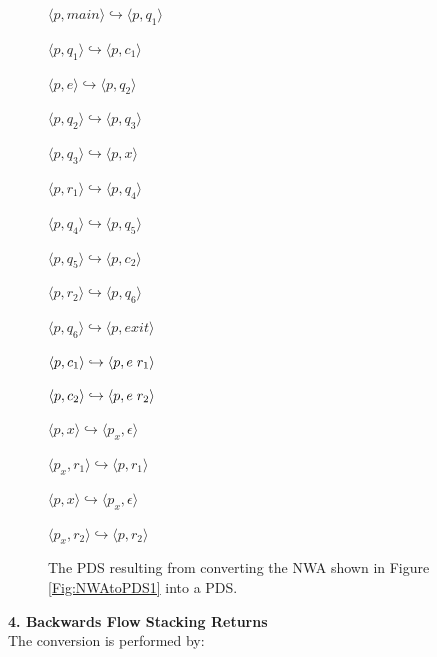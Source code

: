 \documentclass{llncs}
\begin{document}
\begin{figure}[htbp]
  \centering
    \begin{description}
      \centering
      \item $\langle p,main \rangle \hookrightarrow \langle p,q_1 \rangle$
      \item $\langle p,q_1 \rangle \hookrightarrow \langle p,c_1 \rangle$
      \item $\langle p,e \rangle \hookrightarrow \langle p,q_2 \rangle$
      \item $\langle p,q_2 \rangle \hookrightarrow \langle p,q_3 \rangle$
      \item $\langle p,q_3 \rangle \hookrightarrow \langle p,x \rangle$
      \item $\langle p,r_1 \rangle \hookrightarrow \langle p,q_4 \rangle$
      \item $\langle p,q_4 \rangle \hookrightarrow \langle p,q_5 \rangle$
      \item $\langle p,q_5 \rangle \hookrightarrow \langle p,c_2 \rangle$
      \item $\langle p,r_2 \rangle \hookrightarrow \langle p,q_6 \rangle$
      \item $\langle p,q_6 \rangle \hookrightarrow \langle p,exit \rangle$
      \item $\langle p,c_1 \rangle \hookrightarrow \langle p,e \hspace{.1cm} r_1 \rangle$
      \item $\langle p,c_2 \rangle \hookrightarrow \langle p,e \hspace{.1cm} r_2 \rangle$
      \item $\langle p,x \rangle \hookrightarrow \langle p_x, \epsilon \rangle$
      \item $\langle p_x,r_1 \rangle \hookrightarrow \langle p,r_1 \rangle$
      \item $\langle p,x \rangle \hookrightarrow \langle p_x, \epsilon \rangle$
      \item $\langle p_x,r_2 \rangle \hookrightarrow \langle p,r_2 \rangle$
    \end{description}
  \caption{The PDS resulting from converting the NWA shown in Figure \ref{Fig:NWAtoPDS1} into a PDS.}
  \label{Fig:NWAtoPDS2}
\end{figure}

\noindent \textbf{4. Backwards Flow Stacking Returns} \\

\noindent The conversion is performed by:
\end{document}
